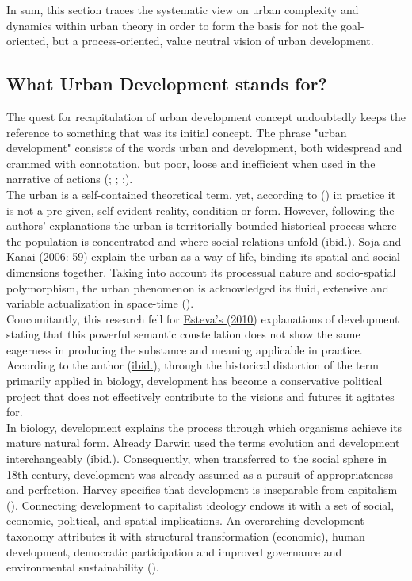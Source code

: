 \documentclass[11pt]{report}
\begin{document}
In sum, this section traces the systematic view on urban complexity and dynamics within urban theory in order to form the basis for not the goal-oriented, but a process-oriented, value neutral vision of urban development.

\subsection{What Urban Development stands for?}

The quest for recapitulation of urban development concept undoubtedly keeps the reference to something that was its initial concept.
The phrase "urban development" consists of the words urban and development, both widespread and crammed with connotation, but poor, loose and inefficient when used in the narrative of actions (\href{ref}{\cite{Bolay2006}}; \href{ref}{\cite{BolayAndKern ppt french}}; \href{ref}{\cite{Bolay what sustainable development 2012}};\href{ref}{\cite{BolayAndKern2012}}).
\\

The urban is a self-contained theoretical term, yet, according to (\href{Brenner}{\cite{BrennerAndSchmidt2013}}) in practice it is not a pre-given, self-evident reality, condition or form. 
However, following the authors' explanations the urban is territorially bounded historical process where the population is concentrated and where social relations unfold (\href{Brenner}{ibid.}).
\href{Soja}{Soja and Kanai (2006: 59)} explain the urban as a way of life, binding its spatial and social dimensions together.
Taking into account its processual nature and socio-spatial polymorphism, the urban phenomenon is acknowledged its fluid, extensive and variable actualization in space-time (\href{Brenner}{\cite{BrennerAndSchmidt2013}}).
\\

Concomitantly, this research fell for \href{Esteva}{Esteva's (2010)} explanations of development stating that this powerful semantic constellation does not show the same eagerness in producing the substance and meaning applicable in practice.
According to the author (\href{Esteva}{ibid.}), through the historical distortion of the term primarily applied in biology, development has become a conservative political project that does not effectively contribute to the visions and futures it agitates for. 
\\

In biology, development explains the process through which organisms achieve its mature natural form.
Already Darwin used the terms evolution and development interchangeably (\href{Esteva}{ibid.}).
Consequently, when transferred to the social sphere in 18th century, development was already assumed as a pursuit of appropriateness and perfection.
Harvey specifies that development is inseparable from capitalism (\href{Harvey}{\cite{Harvey1978}}).
Connecting development to capitalist ideology endows it with a set of social, economic, political, and spatial implications.
An overarching development taxonomy attributes it with structural transformation (economic), human development, democratic participation and improved governance and environmental sustainability (\href{Vázquez}{\cite{VázquezAndSumner2013}}).
\\
\end{document}

